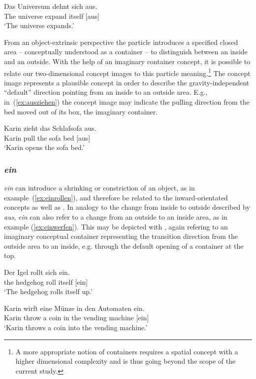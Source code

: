 \documentclass[output=paper]{langsci/langscibook}
\begin{document}
\ea\label{ex:ausdehnen}
\gll Das Universum dehnt sich aus.\\
The universe expand itself [aus]\\
\glt `The universe expands.'
\z

From an object-extrinsic perspective the particle introduces a
specified closed area -- conceptually understood as a container -- to
distinguish between an inside and an outside. With the help of an
imaginary container concept, it is possible to relate our
two-dimensional concept images to this particle meaning.\footnote{A more
  appropriate notion of containers requires a spatial concept with a
  higher dimensional complexity and is thus going beyond the scope of
  the current study.} The concept image  represents a
plausible concept in order to describe the gravity-independent
``default'' direction pointing from an inside to an outside area.
E.g., in~(\ref{ex:ausziehen}) the concept image  may
indicate the pulling direction from the bed moved out of its box, the
imaginary container.

\ea\label{ex:ausziehen}
\gll Karin zieht das Schlafsofa aus.\\
Karin pull the {sofa bed} [aus]\\
\glt `Karin opens the sofa bed.'
\z

\vspace{+1mm}
\subsubsection{\textit{ein}}

\textit{ein} can introduce a shrinking or constriction of an object,
as in example~(\ref{ex:einrollen}), and therefore be related to the
inward-orientated concepts  as well as
. In analogy to the change from inside to outside
described by \textit{aus}, \textit{ein} can also refer to a change
from an outside to an inside area, as in example
(\ref{ex:einwerfen}). This may be depicted with ,
again refering to an imaginary conceptual container representing the
transition direction from the outside area to an inside, e.g.  through
the default opening of a container at the top.

\ea\label{ex:einrollen}
\gll Der Igel rollt sich ein.\\
the hedgehog roll itself [ein]\\
\glt `The hedgehog rolls itself up.'
\z

\ea\label{ex:einwerfen}
\gll Karin wirft eine Münze in den Automaten ein.\\
Karin throw a coin in the {vending machine} [ein]\\
\glt `Karin throws a coin into the vending machine.'
\z
\end{document}
